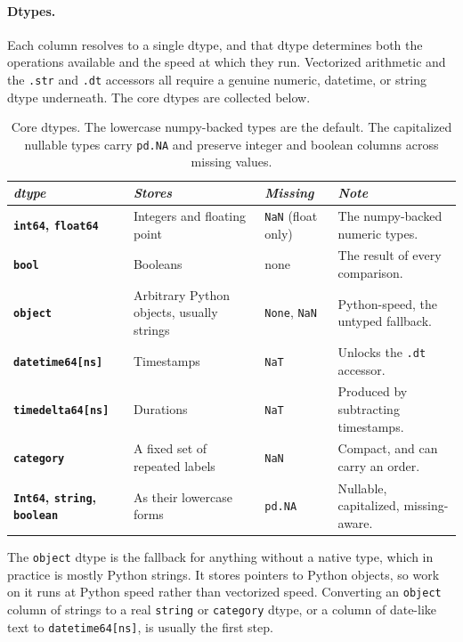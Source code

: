 \paragraph{Dtypes.} Each column resolves to a single dtype, and that dtype determines both the operations available and the speed at which they run. Vectorized arithmetic and the \texttt{.str} and \texttt{.dt} accessors all require a genuine numeric, datetime, or string dtype underneath. The core dtypes are collected below.

\begin{table}[H]
\centering
\footnotesize
\renewcommand{\arraystretch}{1.4}
\begin{tabularx}{\textwidth}{>{\raggedright\arraybackslash}p{} >{\raggedright\arraybackslash}p{} >{\raggedright\arraybackslash}p{} >{\raggedright\arraybackslash}X}
\toprule
\textit{dtype} & \textit{Stores} & \textit{Missing} & \textit{Note} \\
\midrule
\textbf{\texttt{int64}, \texttt{float64}} & Integers and floating point & \texttt{NaN} (float only) & The numpy-backed numeric types. \\
\textbf{\texttt{bool}} & Booleans & none & The result of every comparison. \\
\textbf{\texttt{object}} & Arbitrary Python objects, usually strings & \texttt{None}, \texttt{NaN} & Python-speed, the untyped fallback. \\
\textbf{\texttt{datetime64[ns]}} & Timestamps & \texttt{NaT} & Unlocks the \texttt{.dt} accessor. \\
\textbf{\texttt{timedelta64[ns]}} & Durations & \texttt{NaT} & Produced by subtracting timestamps. \\
\textbf{\texttt{category}} & A fixed set of repeated labels & \texttt{NaN} & Compact, and can carry an order. \\
\textbf{\texttt{Int64}, \texttt{string}, \texttt{boolean}} & As their lowercase forms & \texttt{pd.NA} & Nullable, capitalized, missing-aware. \\
\bottomrule
\end{tabularx}
\caption*{Core dtypes. The lowercase numpy-backed types are the default. The capitalized nullable types carry \texttt{pd.NA} and preserve integer and boolean columns across missing values.}
\end{table}

\vspace{-2ex}

The \texttt{object} dtype is the fallback for anything without a native type, which in practice is mostly Python strings. It stores pointers to Python objects, so work on it runs at Python speed rather than vectorized speed. Converting an \texttt{object} column of strings to a real \texttt{string} or \texttt{category} dtype, or a column of date-like text to \texttt{datetime64[ns]}, is usually the first step.

